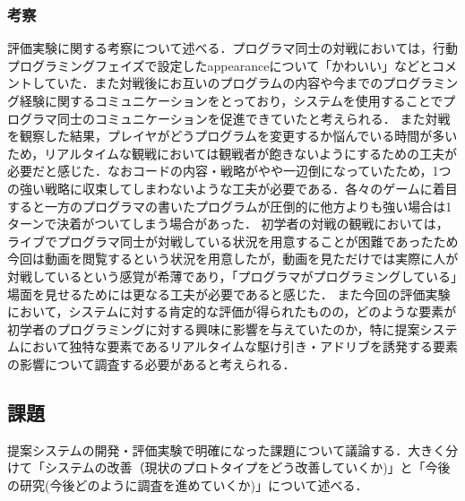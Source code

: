 \subsubsection{考察}
評価実験に関する考察について述べる．プログラマ同士の対戦においては，行動プログラミングフェイズで設定したappearanceについて「かわいい」などとコメントしていた．また対戦後にお互いのプログラムの内容や今までのプログラミング経験に関するコミュニケーションをとっており，システムを使用することでプログラマ同士のコミュニケーションを促進できていたと考えられる．
また対戦を観察した結果，プレイヤがどうプログラムを変更するか悩んでいる時間が多いため，リアルタイムな観戦においては観戦者が飽きないようにするための工夫が必要だと感じた．なおコードの内容・戦略がやや一辺倒になっていたため，1つの強い戦略に収束してしまわないような工夫が必要である．各々のゲームに着目すると一方のプログラマの書いたプログラムが圧倒的に他方よりも強い場合は1ターンで決着がついてしまう場合があった．
初学者の対戦の観戦においては，ライブでプログラマ同士が対戦している状況を用意することが困難であったため今回は動画を閲覧するという状況を用意したが，動画を見ただけでは実際に人が対戦しているという感覚が希薄であり，「プログラマがプログラミングしている」場面を見せるためには更なる工夫が必要であると感じた．
また今回の評価実験において，システムに対する肯定的な評価が得られたものの，どのような要素が初学者のプログラミングに対する興味に影響を与えていたのか，特に提案システムにおいて独特な要素であるリアルタイムな駆け引き・アドリブを誘発する要素の影響について調査する必要があると考えられる．

\subsection{課題}
提案システムの開発・評価実験で明確になった課題について議論する．大きく分けて「システムの改善（現状のプロトタイプをどう改善していくか)」と「今後の研究(今後どのように調査を進めていくか)」について述べる．

